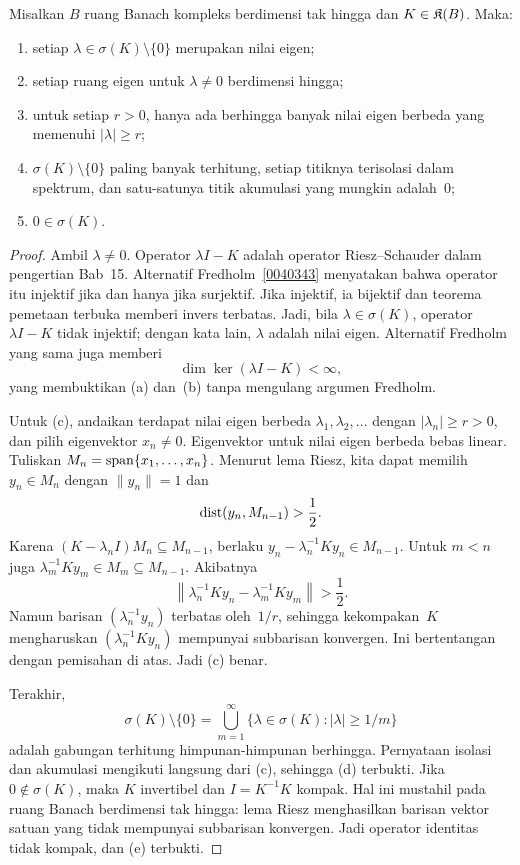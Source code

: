 \begin{thm}
\label{o008bridge:riesz-schauder-spectrum}
Misalkan $B$ ruang Banach kompleks berdimensi tak hingga dan
$K\in\mathfrak{K}(B)$. Maka:
\begin{enumerate}[label=\rm{(\alph*)}]
  \item setiap $\lambda\in\sigma(K)\setminus\{0\}$ merupakan nilai eigen;
  \item setiap ruang eigen untuk $\lambda\neq0$ berdimensi hingga;
  \item untuk setiap $r>0$, hanya ada berhingga banyak nilai eigen berbeda
        yang memenuhi $|\lambda|\geq r$;
  \item $\sigma(K)\setminus\{0\}$ paling banyak terhitung, setiap titiknya
        terisolasi dalam spektrum, dan satu-satunya titik akumulasi yang
        mungkin adalah~$0$;
  \item $0\in\sigma(K)$.
\end{enumerate}
\end{thm}

\begin{proof}
Ambil $\lambda\neq0$. Operator
$\lambda I-K$ adalah operator Riesz--Schauder dalam pengertian
Bab~15. Alternatif Fredholm~\ref{0040343} menyatakan bahwa operator itu
injektif jika dan hanya jika surjektif. Jika injektif, ia bijektif dan teorema
pemetaan terbuka memberi invers terbatas. Jadi, bila
$\lambda\in\sigma(K)$, operator $\lambda I-K$ tidak injektif; dengan kata
lain, $\lambda$ adalah nilai eigen. Alternatif Fredholm yang sama juga memberi
\[
 \dim\ker(\lambda I-K)<\infty,
\]
yang membuktikan (a) dan~(b) tanpa mengulang argumen Fredholm.

Untuk (c), andaikan terdapat nilai eigen berbeda
$\lambda_1,\lambda_2,\ldots$ dengan $|\lambda_n|\geq r>0$, dan pilih
eigenvektor $x_n\neq0$. Eigenvektor untuk nilai eigen berbeda bebas linear.
Tuliskan $M_n=\operatorname{span}\{x_1,\ldots,x_n\}$. Menurut lema Riesz, kita dapat memilih
$y_n\in M_n$ dengan $\|y_n\|=1$ dan
\[
  \operatorname{dist}(y_n,M_{n-1})>\frac12.
\]
Karena $(K-\lambda_n I)M_n\subseteq M_{n-1}$, berlaku
$y_n-\lambda_n^{-1}Ky_n\in M_{n-1}$. Untuk $m<n$ juga
$\lambda_m^{-1}Ky_m\in M_m\subseteq M_{n-1}$. Akibatnya
\[
 \left\|\lambda_n^{-1}Ky_n-\lambda_m^{-1}Ky_m\right\|>\frac12.
\]
Namun barisan $(\lambda_n^{-1}y_n)$ terbatas oleh~$1/r$, sehingga
kekompakan~$K$ mengharuskan $(\lambda_n^{-1}Ky_n)$ mempunyai subbarisan
konvergen. Ini bertentangan dengan pemisahan di atas. Jadi (c) benar.

Terakhir,
\[
 \sigma(K)\setminus\{0\}
 =\bigcup_{m=1}^{\infty}
   \{\lambda\in\sigma(K):|\lambda|\geq1/m\}
\]
adalah gabungan terhitung himpunan-himpunan berhingga. Pernyataan isolasi dan
akumulasi mengikuti langsung dari (c), sehingga (d) terbukti. Jika
$0\notin\sigma(K)$, maka $K$ invertibel dan
$I=K^{-1}K$ kompak. Hal ini mustahil pada ruang Banach berdimensi tak hingga:
lema Riesz menghasilkan barisan vektor satuan yang tidak mempunyai
subbarisan konvergen. Jadi operator identitas tidak kompak, dan (e) terbukti.
\end{proof}

